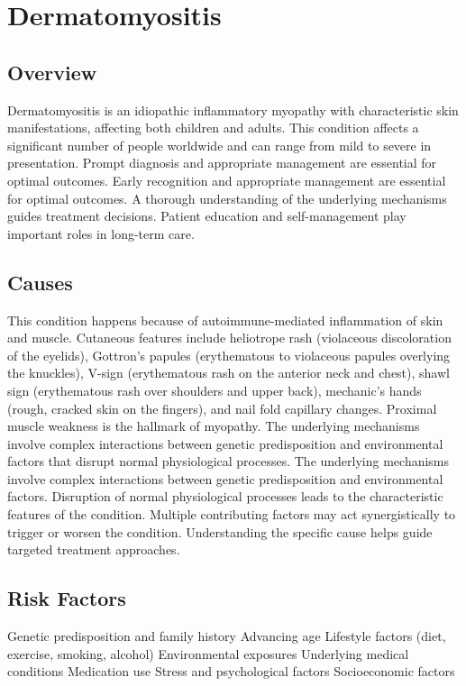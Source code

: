 \chapter{Dermatomyositis}
\label{sec:skin:Dermatomyositis}

\section{Overview}
Dermatomyositis is an idiopathic inflammatory myopathy with characteristic skin manifestations, affecting both children and adults. This condition affects a significant number of people worldwide and can range from mild to severe in presentation. Prompt diagnosis and appropriate management are essential for optimal outcomes. Early recognition and appropriate management are essential for optimal outcomes. A thorough understanding of the underlying mechanisms guides treatment decisions. Patient education and self-management play important roles in long-term care.
\section{Causes}
This condition happens because of autoimmune-mediated inflammation of skin and muscle. Cutaneous features include heliotrope rash (violaceous discoloration of the eyelids), Gottron's papules (erythematous to violaceous papules overlying the knuckles), V-sign (erythematous rash on the anterior neck and chest), shawl sign (erythematous rash over shoulders and upper back), mechanic's hands (rough, cracked skin on the fingers), and nail fold capillary changes. Proximal muscle weakness is the hallmark of myopathy. The underlying mechanisms involve complex interactions between genetic predisposition and environmental factors that disrupt normal physiological processes. The underlying mechanisms involve complex interactions between genetic predisposition and environmental factors. Disruption of normal physiological processes leads to the characteristic features of the condition. Multiple contributing factors may act synergistically to trigger or worsen the condition. Understanding the specific cause helps guide targeted treatment approaches.
\section{Risk Factors}
Genetic predisposition and family history Advancing age Lifestyle factors (diet, exercise, smoking, alcohol) Environmental exposures Underlying medical conditions Medication use Stress and psychological factors Socioeconomic factors

